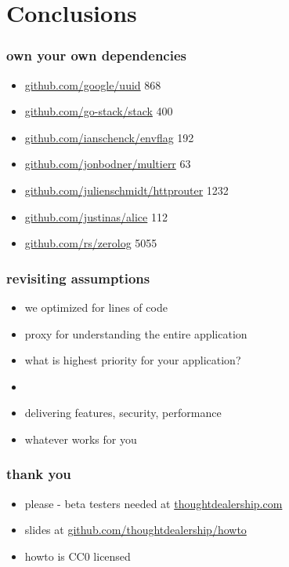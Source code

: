 \documentclass{beamer}
\begin{document}
\section{Conclusions}

\begin{frame}
\frametitle{own your own dependencies}
\begin{itemize}
\item \href{https://github.com/google/uuid}{github.com/google/uuid} 868
\item \href{https://github.com/go-stack/stack}{github.com/go-stack/stack} 400
\item \href{https://github.com/ianschenck/envflag}{github.com/ianschenck/envflag} 192
\item \href{https://github.com/jonbodner/multierr}{github.com/jonbodner/multierr} 63
\item \href{https://github.com/julienschmidt/httprouter}{github.com/julienschmidt/httprouter} 1232
\item \href{https://github.com/justinas/alice}{github.com/justinas/alice} 112
\item \href{https://github.com/rs/zerolog}{github.com/rs/zerolog} 5055
\end{itemize}
\end{frame}

\begin{frame}
\frametitle{revisiting assumptions}
\begin{itemize}
\item we optimized for lines of code
\item proxy for understanding the entire application
\item what is highest priority for your application?
\item{}
\item<2-> delivering features, security, performance
\item<2-> whatever works for you
\end{itemize}
\end{frame}

\begin{frame}
	\frametitle{thank you}
	\begin{itemize}
		\item please - beta testers needed at \href{https://thoughtdealership.com}{thoughtdealership.com}
		\item slides at \href{https://github.com/thoughtdealership/howto}{github.com/thoughtdealership/howto}
		\item howto is CC0 licensed
	\end{itemize}
	\end{frame}
\end{document}
